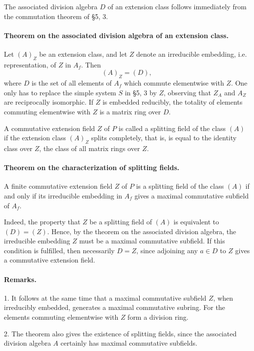 \documentclass[11pt]{article}
\begin{document}
The associated division algebra \(D\) of an extension class follows immediately from the commutation theorem of §5, 3.

\paragraph{Theorem on the associated division algebra of an extension class.}
Let \((A)_Z\) be an extension class, and let \(Z\) denote an irreducible embedding, i.e. representation, of \(Z\) in \(A_f\). Then
\[
        (A)_Z=(D),
\]
where \(D\) is the set of all elements of \(A_f\) which commute elementwise with \(Z\). One only has to replace the simple system \(S\) in §5, 3 by \(Z\), observing that \(Z_A\) and \(A_Z\) are reciprocally isomorphic. If \(Z\) is embedded reducibly, the totality of elements commuting elementwise with \(Z\) is a matrix ring over \(D\).

A commutative extension field \(Z\) of \(P\) is called a splitting field of the class \((A)\) if the extension class \((A)_Z\) splits completely, that is, is equal to the identity class over \(Z\), the class of all matrix rings over \(Z\).

\paragraph{Theorem on the characterization of splitting fields.}
A finite commutative extension field \(Z\) of \(P\) is a splitting field of the class \((A)\) if and only if its irreducible embedding in \(A_f\) gives a maximal commutative subfield of \(A_f\).

Indeed, the property that \(Z\) be a splitting field of \((A)\) is equivalent to \((D)=(Z)\). Hence, by the theorem on the associated division algebra, the irreducible embedding \(Z\) must be a maximal commutative subfield. If this condition is fulfilled, then necessarily \(D=Z\), since adjoining any \(a\in D\) to \(Z\) gives a commutative extension field.

\paragraph{Remarks.}
1. It follows at the same time that a maximal commutative subfield \(Z\), when irreducibly embedded, generates a maximal commutative subring. For the elements commuting elementwise with \(Z\) form a division ring.

2. The theorem also gives the existence of splitting fields, since the associated division algebra \(A\) certainly has maximal commutative subfields.
\end{document}
